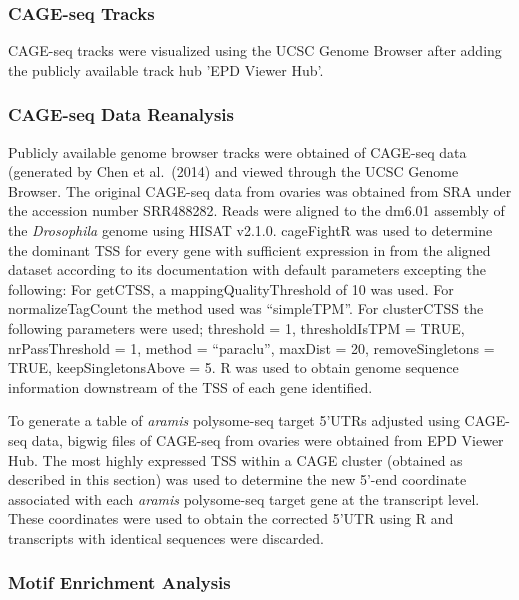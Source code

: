 \documentclass[12pt,oneside]{reedthesis}
\begin{document}
\hypertarget{cage-seq-tracks}{%
\subsubsection{CAGE-seq Tracks}\label{cage-seq-tracks}}

CAGE-seq tracks were visualized using the UCSC Genome Browser after adding the publicly available track hub 'EPD Viewer Hub'.

\hypertarget{cage-seq-data-reanalysis}{%
\subsubsection{CAGE-seq Data Reanalysis}\label{cage-seq-data-reanalysis}}

Publicly available genome browser tracks were obtained of CAGE-seq data (generated by Chen et al.~(2014) and viewed through the UCSC Genome Browser. The original CAGE-seq data from ovaries was obtained from SRA under the accession number SRR488282. Reads were aligned to the dm6.01 assembly of the \emph{Drosophila} genome using HISAT v2.1.0. cageFightR was used to determine the dominant TSS for every gene with sufficient expression in from the aligned dataset according to its documentation with default parameters excepting the following: For getCTSS, a mappingQualityThreshold of 10 was used. For normalizeTagCount the method used was ``simpleTPM''. For clusterCTSS the following parameters were used; threshold = 1, thresholdIsTPM = TRUE, nrPassThreshold = 1, method = ``paraclu'', maxDist = 20, removeSingletons = TRUE, keepSingletonsAbove = 5. R was used to obtain genome sequence information downstream of the TSS of each gene identified.

To generate a table of \emph{aramis} polysome-seq target 5'UTRs adjusted using CAGE-seq data, bigwig files of CAGE-seq from ovaries were obtained from EPD Viewer Hub. The most highly expressed TSS within a CAGE cluster (obtained as described in this section) was used to determine the new 5'-end coordinate associated with each \emph{aramis} polysome-seq target gene at the transcript level. These coordinates were used to obtain the corrected 5'UTR using R and transcripts with identical sequences were discarded.

\hypertarget{motif-enrichment-analysis}{%
\subsubsection{Motif Enrichment Analysis}\label{motif-enrichment-analysis}}
\end{document}
